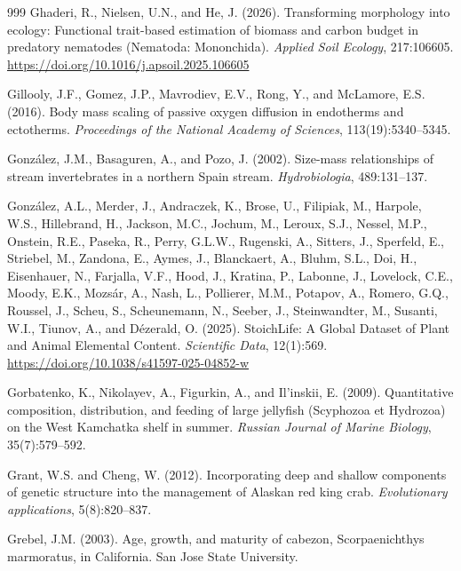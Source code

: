 \begin{thebibliography}{999}
Ghaderi, R., Nielsen, U.N., and He, J. (2026). Transforming morphology into ecology: Functional trait-based estimation of biomass and carbon budget in predatory nematodes (Nematoda: Mononchida). \textit{Applied Soil Ecology}, 217:106605. \url{https://doi.org/10.1016/j.apsoil.2025.106605}

Gillooly, J.F., Gomez, J.P., Mavrodiev, E.V., Rong, Y., and McLamore, E.S. (2016). Body mass scaling of passive oxygen diffusion in endotherms and ectotherms. \textit{Proceedings of the National Academy of Sciences}, 113(19):5340--5345.

Gonz{\'a}lez, J.M., Basaguren, A., and Pozo, J. (2002). Size-mass relationships of stream invertebrates in a northern Spain stream. \textit{Hydrobiologia}, 489:131--137.

Gonz{\'a}lez, A.L., Merder, J., Andraczek, K., Brose, U., Filipiak, M., Harpole, W.S., Hillebrand, H., Jackson, M.C., Jochum, M., Leroux, S.J., Nessel, M.P., Onstein, R.E., Paseka, R., Perry, G.L.W., Rugenski, A., Sitters, J., Sperfeld, E., Striebel, M., Zandona, E., Aymes, J., Blanckaert, A., Bluhm, S.L., Doi, H., Eisenhauer, N., Farjalla, V.F., Hood, J., Kratina, P., Labonne, J., Lovelock, C.E., Moody, E.K., Mozs{\'a}r, A., Nash, L., Pollierer, M.M., Potapov, A., Romero, G.Q., Roussel, J., Scheu, S., Scheunemann, N., Seeber, J., Steinwandter, M., Susanti, W.I., Tiunov, A., and D{\'e}zerald, O. (2025). StoichLife: A Global Dataset of Plant and Animal Elemental Content. \textit{Scientific Data}, 12(1):569. \url{https://doi.org/10.1038/s41597-025-04852-w}

Gorbatenko, K., Nikolayev, A., Figurkin, A., and Il'inskii, E. (2009). Quantitative composition, distribution, and feeding of large jellyfish (Scyphozoa et Hydrozoa) on the West Kamchatka shelf in summer. \textit{Russian Journal of Marine Biology}, 35(7):579--592.

Grant, W.S. and Cheng, W. (2012). Incorporating deep and shallow components of genetic structure into the management of Alaskan red king crab. \textit{Evolutionary applications}, 5(8):820--837.

Grebel, J.M. (2003). Age, growth, and maturity of cabezon, Scorpaenichthys marmoratus, in California. San Jose State University.


\end{thebibliography}

